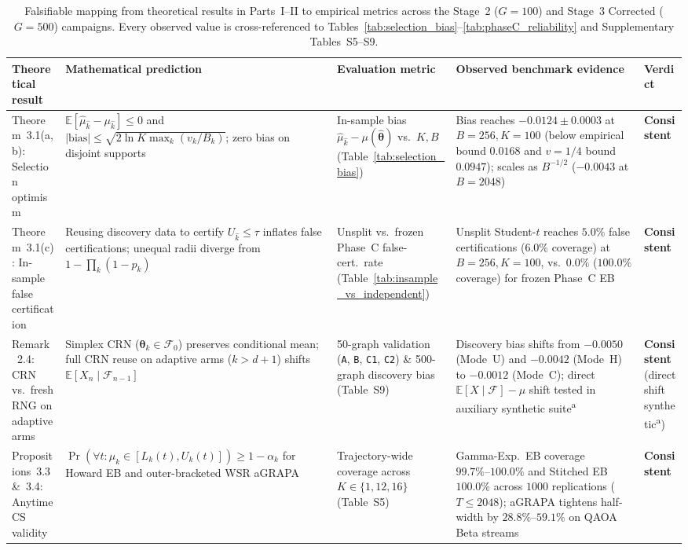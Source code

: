 \begin{table}[htbp]
\caption{Falsifiable mapping from theoretical results in Parts~I--II to empirical metrics across the Stage~2 ($G=100$) and Stage~3 Corrected ($G=500$) campaigns. Every observed value is cross-referenced to Tables~\ref{tab:selection_bias}--\ref{tab:phaseC_reliability} and Supplementary Tables~S5--S9.}
\label{tab:theory_vs_experiment}
\centering
\scriptsize
\begin{tabular}{@{}p{2.5cm} p{3.6cm} p{2.9cm} p{5.4cm} p{2.2cm}@{}}
\toprule
Theoretical result & Mathematical prediction & Evaluation metric & Observed benchmark evidence & Verdict \\
\midrule
Theorem~3.1(a,b): Selection optimism & $\mathbb{E}[\hat{\mu}_{\hat{k}}-\mu_{\hat{k}}] \le 0$ and $|\text{bias}| \le \sqrt{2\ln K\max_k(v_k/B_k)}$; zero bias on disjoint supports & In-sample bias $\hat{\mu}_{\hat{k}} - \mu(\hat{\bm{\theta}})$ vs.\ $K, B$ (Table~\ref{tab:selection_bias}) & Bias reaches $-0.0124 \pm 0.0003$ at $B=256, K=100$ (below empirical bound $0.0168$ and $v=1/4$ bound $0.0947$); scales as $B^{-1/2}$ ($-0.0043$ at $B=2048$) & \textbf{Consistent} \\
Theorem~3.1(c): In-sample false certification & Reusing discovery data to certify $U_{\hat{k}} \le \tau$ inflates false certifications; unequal radii diverge from $1-\prod_k(1-p_k)$ & Unsplit vs.\ frozen Phase~C false-cert.\ rate (Table~\ref{tab:insample_vs_independent}) & Unsplit Student-$t$ reaches $5.0\%$ false certifications ($6.0\%$ coverage) at $B=256, K=100$, vs.\ $0.0\%$ ($100.0\%$ coverage) for frozen Phase~C EB & \textbf{Consistent} \\
Remark~2.4: CRN vs.\ fresh RNG on adaptive arms & Simplex CRN ($\bm{\theta}_k\in\mathcal{F}_0$) preserves conditional mean; full CRN reuse on adaptive arms ($k>d+1$) shifts $\mathbb{E}[X_n\mid\mathcal{F}_{n-1}]$ & 50-graph validation (\texttt{A}, \texttt{B}, \texttt{C1}, \texttt{C2}) \& 500-graph discovery bias (Table~S9) & Discovery bias shifts from $-0.0050$ (Mode~U) and $-0.0042$ (Mode~H) to $-0.0012$ (Mode~C); direct $\mathbb{E}[X\mid\mathcal{F}]-\mu$ shift tested in auxiliary synthetic suite\textsuperscript{a} & \textbf{Consistent} (direct shift synthetic\textsuperscript{a}) \\
Propositions~3.3 \&~3.4: Anytime CS validity & $\Pr(\forall t: \mu_k \in [L_k(t), U_k(t)]) \ge 1-\alpha_k$ for Howard EB and outer-bracketed WSR aGRAPA & Trajectory-wide coverage across $K \in \{1,12,16\}$ (Table~S5) & Gamma-Exp.\ EB coverage $99.7\%\text{--}100.0\%$ and Stitched EB $100.0\%$ across $1000$ replications ($T \le 2048$); aGRAPA tightens half-width by $28.8\%\text{--}59.1\%$ on QAOA Beta streams & \textbf{Consistent} \\

\end{tabular}
\end{table}
